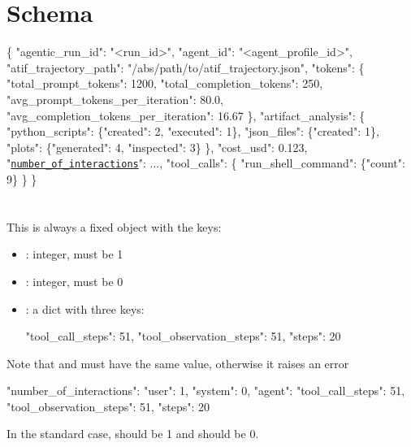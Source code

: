 \documentclass[11pt]{article}
\begin{document}
\section*{ Schema}

\newcommand{\trajectoryEvaluationNumberOfInteractionsLink}{\hyperref[sec:trajectory-evaluation-number-of-interactions]{\texttt{number\_of\_interactions}}}

\begin{LinkedDocCode}
\{
  "agentic_run_id": "<run_id>",
  "agent_id": "<agent_profile_id>",
  "atif_trajectory_path": "/abs/path/to/atif_trajectory.json",
  "tokens": \{
    "total_prompt_tokens": 1200,
    "total_completion_tokens": 250,
    "avg_prompt_tokens_per_iteration": 80.0,
    "avg_completion_tokens_per_iteration": 16.67
  \},
  "artifact_analysis": \{
    "python_scripts": \{"created": 2, "executed": 1\},
    "json_files": \{"created": 1\},
    "plots": \{"generated": 4, "inspected": 3\}
  \},
  "cost_usd": 0.123,
  "\trajectoryEvaluationNumberOfInteractionsLink": ...,
  "tool_calls": \{
    "run_shell_command": \{"count": 9\}
  \}
\}
\end{LinkedDocCode}



\section*{}
\label{sec:trajectory-evaluation-number-of-interactions}

This is always a fixed object with the keys:
\begin{itemize}
\item {}: integer, must be 1
\item {}: integer, must be 0
\item {}: a dict with three keys:
\begin{DocCode}
{
  "tool_call_steps": 51,
  "tool_observation_steps": 51,
  "steps": 20
}
\end{DocCode}
\end{itemize}
Note that  and  must have the same value, otherwise it raises an error

\begin{DocCode}
{
  "number_of_interactions": {
    "user": 1,
    "system": 0,
    "agent": {
      "tool_call_steps": 51,
      "tool_observation_steps": 51,
      "steps": 20
    }
  }
}
\end{DocCode}
In the standard case,  should be 1 and  should be 0.
\end{document}
